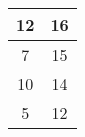 \begin{table}[H]
\begin{tabular}{cc}
\multicolumn{1}{|c|}{12}                                                        & \multicolumn{1}{c|}{16}                                                             \\ \hline
\multicolumn{1}{|c|}{7}                                                        & \multicolumn{1}{c|}{15}                                                             \\ \hline
\multicolumn{1}{|c|}{10}                                                        & \multicolumn{1}{c|}{14}                                                             \\ \hline
\multicolumn{1}{|c|}{5}                                                        & \multicolumn{1}{c|}{12}                                                             \\ \hline
\end{tabular}\end{table}